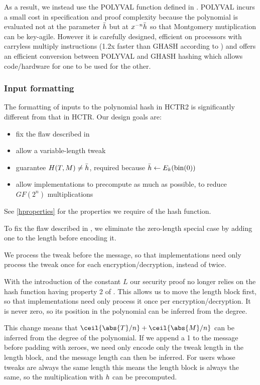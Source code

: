 \documentclass[hctr2.tex]{subfiles}
\begin{document}
As a result, we instead use the POLYVAL function
defined in \cite{aes_gcm_siv,aes_gcm_siv_rfc}.
POLYVAL incurs a small cost in specification and proof complexity because 
the polynomial is evaluated not at the parameter \(\bar{h}\)
but at \(x^{-n}\bar{h}\)
so that Montgomery mutiplication\cite{montmul} can be key-agile.
However it is carefully designed, efficient
on processors with carryless multiply instructions
(1.2x faster than GHASH according to \cite{aes_gcm_siv})
and offers an efficient conversion between POLYVAL and GHASH hashing
which allows code/hardware for one to be used for the other.

\subsubsection{Input formatting}

The formatting of inputs to the polynomial hash in HCTR2 is significantly
different from that in HCTR. Our design goals are:

\begin{itemize}
    \item fix the flaw described in \cite{kumarhctr}
    \item allow a variable-length tweak
    \item guarantee \(H(T, M) \neq \bar{h}\), required
    because \(\bar{h} \gets E_k(\operatorname{bin}(0))\)
    \item allow implementations to precompute as much as possible, to reduce \(GF(2^n)\) multiplications
\end{itemize}

See \autoref{hproperties}
for the properties we require of the hash function.

To fix the flaw described in \cite{kumarhctr},
we eliminate the zero-length special case
by adding one to the length before encoding it.

We process the tweak before the message, so that implementations need only
process the tweak once for each encryption/decryption, instead of twice.

With the introduction of the constant \(L\)
our security proof no longer relies on the hash function
having property 2 of \cite[Section~3.3]{hctr}.
This allows us to move the length block first, so
that implementations need only process it once per encryption/decryption.
It is never zero, so its position in the
polynomial can be inferred from the degree.

This change means that \(\ceil{\abs{T}/n} + \ceil{\abs{M}/n}\)
can be inferred from the degree of the polynomial.  
If we append a 1 to the message before padding with zeroes,
we need only encode only the tweak length in the length block,
and the message length can then be inferred.
For users whose tweaks are always the same length
this means the length block is always the same, 
so the multiplication with \(h\) can be
precomputed.
\end{document}
